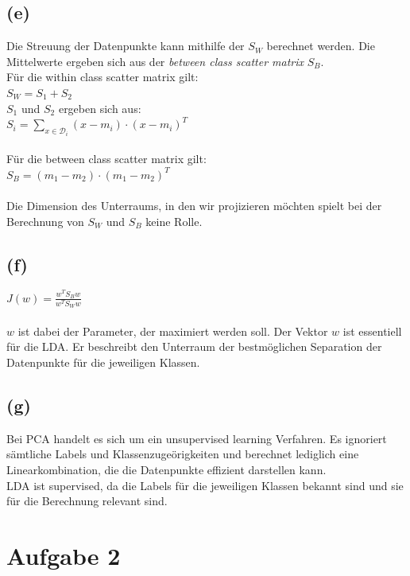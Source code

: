\documentclass[a4paper]{scrartcl}
\newcounter{punkte}
\begin{document}
\subsection*{(e)}
Die Streuung der Datenpunkte kann mithilfe der  $S_W$ berechnet werden. Die Mittelwerte ergeben sich aus der \textit{between class scatter matrix} $S_B$.\\
Für die within class scatter matrix gilt:\\
$
S_W = S_1 + S_2
$\\
$S_1$ und $S_2$ ergeben sich aus:\\
$
S_i = \sum_{x\in\mathcal{D}_i}(x-m_i)\cdot(x-m_i)^T
$\\
\\
Für die between class scatter matrix gilt:\\
$
S_B = (m_1 - m_2)\cdot(m_1-m_2)^T
$\\
\\
Die Dimension des Unterraums, in den wir projizieren möchten spielt bei der Berechnung von $S_W$ und $S_B$ keine Rolle.



\subsection*{(f)}
$J(w) = \frac{w^T S_B w}{w^T S_W w}$\\
\\
$w$ ist dabei der Parameter, der maximiert werden soll. Der  Vektor $w$ ist essentiell für die LDA. Er beschreibt den Unterraum der bestmöglichen Separation der Datenpunkte für die jeweiligen Klassen.


\subsection*{(g)}
Bei PCA handelt es sich um ein unsupervised learning Verfahren. Es ignoriert sämtliche Labels und Klassenzugeörigkeiten und berechnet lediglich eine Linearkombination, die die Datenpunkte effizient darstellen kann.\\
LDA ist supervised, da die Labels für die jeweiligen Klassen bekannt sind und sie für die Berechnung relevant sind.


\section*{Aufgabe 2}
\end{document}
